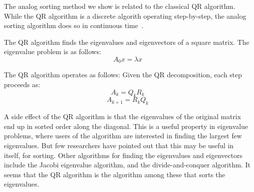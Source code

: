 The analog sorting method we show is related to the classical QR algorithm.
While the QR algorithm is a discrete algorith operating step-by-step, the analog sorting algorithm does so in continuous time~\cite{deift, chu_realization, chu_flows}.

The QR algorithm finds the eigenvalues and eigenvectors of a square matrix.
The eigenvalue problem is as follows:
\[A_0x = \lambda x\]

The QR algorithm operates as follows:
Given the QR decomposition, each step proceeds as:
\[A_k = Q_k R_k\]
\[A_{k+1} = R_k Q_k\]

A side effect of the QR algorithm is that the eigenvalues of the original matrix end up in sorted order along the diagonal.
This is a useful property in eigenvalue problems, where users of the algorithm are interested in finding the largest few eigenvalues.
But few researchers have pointed out that this may be useful in itself, for sorting.
Other algorithms for finding the eigenvalues and eigenvectors include the Jacobi eigenvalue algorithm, and the divide-and-conquer algorithm.
It seems that the QR algorithm is the algorithm among these that sorts the eigenvalues.
